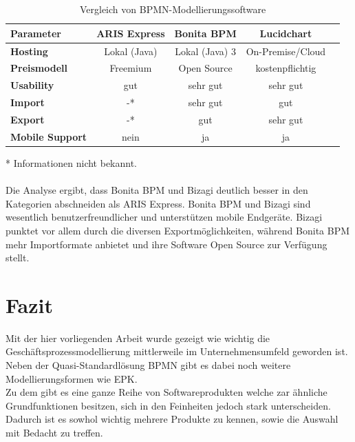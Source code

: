 \\
\\

\begin{table}[h]
\begin{tabularx}{\textwidth}{|X|c|c|c|c|}
	\hline
	\textbf{Parameter}  & \textbf{ARIS Express} &
	\textbf{Bonita BPM} & \textbf{Lucidchart}  \\
	\hline
	\hline
	\textbf{Hosting} & {Lokal (Java)} & {Lokal (Java)} 3 & {On-Premise/Cloud}
	\\
	\hline
	\textbf{Preismodell} & Freemium & Open Source &  kostenpflichtig\\
	\hline
	\textbf{Usability} & gut & sehr gut & sehr gut \\
	\hline
	\textbf{Import} & -* & sehr gut & gut \\
	\hline
	\textbf{Export} & -* & gut & sehr gut \\
	\hline
	\textbf{Mobile Support} & nein & ja & ja \\
	\hline
\end{tabularx}
\caption{Vergleich von BPMN-Modellierungssoftware}
\end{table}
* Informationen nicht bekannt.
\\
\\
Die Analyse ergibt, dass Bonita BPM und Bizagi deutlich
besser in den Kategorien abschneiden als ARIS Express. Bonita BPM und Bizagi
sind wesentlich benutzerfreundlicher und unterstützen mobile
Endgeräte. Bizagi punktet vor allem durch die diversen Exportmöglichkeiten, während Bonita BPM mehr Importformate anbietet und ihre
Software Open Source zur Verfügung stellt.

\clearpage
\section{Fazit}

Mit der hier vorliegenden Arbeit wurde gezeigt wie wichtig die
Geschäftsprozessmodellierung mittlerweile im Unternehmensumfeld geworden ist.
Neben der Quasi-Standardlösung BPMN gibt es dabei noch weitere
Modellierungsformen wie EPK.\\
Zu dem gibt es eine ganze Reihe von Softwareprodukten welche zar ähnliche
Grundfunktionen besitzen, sich in den Feinheiten jedoch stark unterscheiden.
Dadurch ist es sowhol wichtig mehrere Produkte zu kennen, sowie die Auswahl
 mit Bedacht zu treffen.


\clearpage
